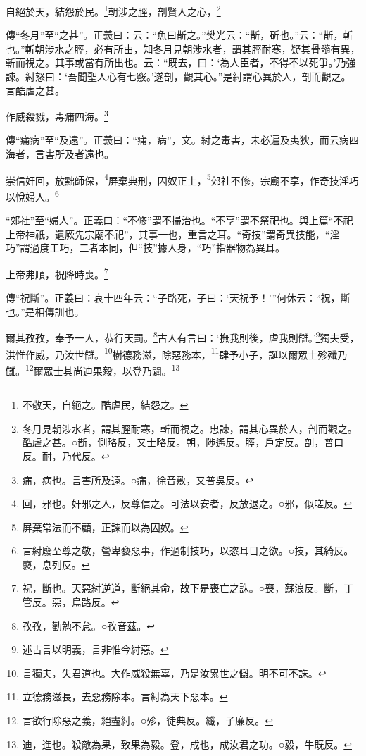 自絕於天，結怨於民。\footnote{不敬天，自絕之。酷虐民，結怨之。}朝涉之脛，剖賢人之心，\footnote{冬月見朝涉水者，謂其脛耐寒，斬而視之。忠諫，謂其心異於人，剖而觀之。酷虐之甚。○斮，側略反，又士略反。朝，陟遙反。脛，戶定反。剖，普口反。耐，乃代反。}

{\noindent\zhuan{}\fzbyks 傳“冬月”至“之甚”。正義曰：云：“魚曰斮之。”樊光云：“斮，斫也。”云：“斮，斬也。”斬朝涉水之脛，必有所由，知冬月見朝涉水者，謂其脛耐寒，疑其骨髓有異，斬而視之。其事或當有所出也。云：“既去，曰：‘為人臣者，不得不以死爭。’乃強諫。紂怒曰：‘吾聞聖人心有七竅。’遂剖，觀其心。”是紂謂心異於人，剖而觀之。言酷虐之甚。 \par}

作威殺戮，毒痡四海。\footnote{痡，病也。言害所及遠。○痡，徐音敷，又普吳反。}

{\noindent\zhuan{}\fzbyks 傳“痡病”至“及遠”。正義曰：“痡，病”，文。紂之毒害，未必遍及夷狄，而云病四海者，言害所及者遠也。 \par}

崇信奸回，放黜師保，\footnote{回，邪也。奸邪之人，反尊信之。可法以安者，反放退之。○邪，似嗟反。}屏棄典刑，囚奴正士，\footnote{屏棄常法而不顧，正諫而以為囚奴。}郊社不修，宗廟不享，作奇技淫巧以悅婦人。\footnote{言紂廢至尊之敬，營卑褻惡事，作過制技巧，以恣耳目之欲。○技，其綺反。褻，息列反。}

{\noindent\shu{}\fzkt “郊社”至“婦人”。正義曰：“不修”謂不掃治也。“不享”謂不祭祀也。與上篇“不祀上帝神祇，遺厥先宗廟不祀”，其事一也，重言之耳。“奇技”謂奇異技能，“淫巧”謂過度工巧，二者本同，但“技”據人身，“巧”指器物為異耳。 \par}

上帝弗順，祝降時喪。\footnote{祝，斷也。天惡紂逆道，斷絕其命，故下是喪亡之誅。○喪，蘇浪反。斷，丁管反。惡，烏路反。}

{\noindent\zhuan{}\fzbyks 傳“祝斷”。正義曰：哀十四年云：“子路死，子曰：‘天祝予！’”何休云：“祝，斷也。”是相傳訓也。 \par}

爾其孜孜，奉予一人，恭行天罰。\footnote{孜孜，勸勉不怠。○孜音茲。}古人有言曰：‘撫我則後，虐我則讎。’\footnote{述古言以明義，言非惟今紂惡。}獨夫受，洪惟作威，乃汝世讎。\footnote{言獨夫，失君道也。大作威殺無辜，乃是汝累世之讎。明不可不誅。}樹德務滋，除惡務本，\footnote{立德務滋長，去惡務除本。言紂為天下惡本。}肆予小子，誕以爾眾士殄殲乃讎。\footnote{言欲行除惡之義，絕盡紂。○殄，徒典反。纖，子廉反。}爾眾士其尚迪果毅，以登乃闢。\footnote{迪，進也。殺敵為果，致果為毅。登，成也，成汝君之功。○毅，牛既反。}

